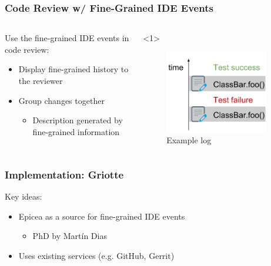 \documentclass[aspectratio=169]{beamer}
\begin{document}
\begin{frame}[fragile]

\frametitle{Code Review w/ Fine-Grained IDE Events}

\begin{columns}

\begin{column}{0.5\textwidth}

Use the fine-grained IDE events in code review:

\begin{itemize}
\item<1-> Display fine-grained history to the reviewer
\item<2-> Group changes together
\begin{itemize}
\item<2-> Description generated by fine-grained information
\end{itemize}

\end{itemize}
\end{column}

\begin{column}{0.5\textwidth}

\begin{onlyenv}<1>
\begin{figure}
\begin{center}
\includegraphics[width=0.9\textwidth]{img/example_log.pdf}
\end{center}
\caption{Example log}
\end{figure}
\end{onlyenv}

\end{column}

\end{columns}

\end{frame}

\begin{frame}[fragile]

\frametitle{Implementation: Griotte}

Key ideas:

\begin{itemize}
\item Epicea as a source for fine-grained IDE events
\begin{itemize}
\item PhD by Mart\'{i}n Dias
\end{itemize}

\item Uses existing services (e.g. GitHub, Gerrit)
\end{itemize}
\end{frame}
\end{document}
